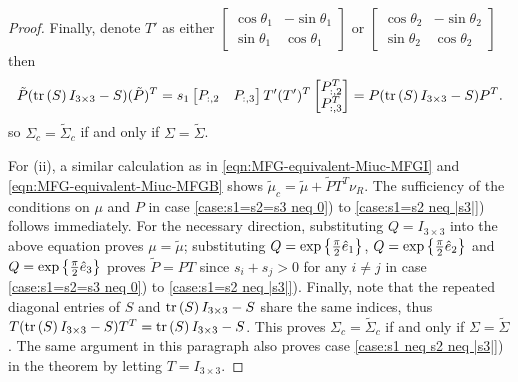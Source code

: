 \begin{proof}
	Finally, denote $T'$ as either $\begin{bmatrix} \cos\theta_1 & -\sin\theta_1 \\ \sin\theta_1 & \cos\theta_1\end{bmatrix}$ or $\begin{bmatrix} \cos\theta_2 & -\sin\theta_2 \\ \sin\theta_2 & \cos\theta_2\end{bmatrix}$ then
	\begin{align}
		\tilde{P}(\mathrm{tr}\left( S \right)I_{3 \times 3}-S)(\tilde{P})^T = s_1 \begin{bmatrix} P_{:,2} & P_{:,3} \end{bmatrix}  T'(T')^T \begin{bmatrix} P_{:,2}^T \\  P_{:,3}^T \end{bmatrix} = P(\mathrm{tr}\left( S \right)I_{3 \times 3}-S)P^T.
	\end{align}
	so $\Sigma_c = \tilde{\Sigma}_c$ if and only if $\Sigma = \tilde{\Sigma}$.
	
	For (ii), a similar calculation as in \eqref{eqn:MFG-equivalent-Miuc-MFGI} and \eqref{eqn:MFG-equivalent-Miuc-MFGB} shows $\tilde{\mu}_c = \tilde{\mu} + \tilde{P}T^T \nu_R$.
	The sufficiency of the conditions on $\mu$ and $P$ in case \ref{case:s1=s2=s3 neq 0}) to \ref{case:s1=s2 neq |s3|}) follows immediately.
	For the necessary direction, substituting $Q = I_{3 \times 3}$ into the above equation proves $\mu = \tilde{\mu}$;
	substituting $Q = \exp\left\{ \tfrac{\pi}{2}\hat{e}_1 \right\}$, $Q = \exp\left\{ \tfrac{\pi}{2}\hat{e}_2 \right\}$ and $Q = \exp\left\{ \tfrac{\pi}{2}\hat{e}_3 \right\}$ proves $\tilde{P} = PT$ since $s_i+s_j>0$ for any $i \neq j$ in case \ref{case:s1=s2=s3 neq 0}) to \ref{case:s1=s2 neq |s3|}).
	Finally, note that the repeated diagonal entries of $S$ and $\mathrm{tr}\left( S \right)I_{3 \times 3}-S$ share the same indices, thus $T(\mathrm{tr}\left( S \right)I_{3 \times 3}-S)T^T = \mathrm{tr}\left( S \right)I_{3 \times 3}-S$.
	This proves $\Sigma_c = \tilde{\Sigma}_c$ if and only if $\Sigma = \tilde{\Sigma}$.
	The same argument in this paragraph also proves case \ref{case:s1 neq s2 neq |s3|}) in the theorem by letting $T = I_{3 \times 3}$.
	

\end{proof}
